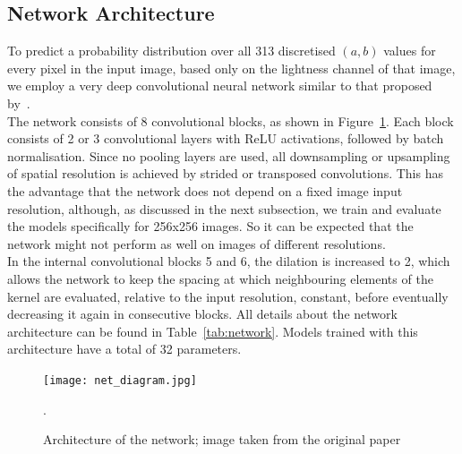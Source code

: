 \documentclass{article}
\begin{document}
\subsection{Network Architecture}
To predict a probability distribution over all 313 discretised $(a, b)$ values for every pixel in the input image,
based only on the lightness channel of that image, we employ a very deep convolutional neural network similar to
that proposed by~\cite{colourful}.\\
The network consists of 8 convolutional blocks, as shown in Figure~\ref{fig:network}.
Each block consists of 2 or 3 convolutional layers with ReLU activations, followed by batch normalisation.
Since no pooling layers are used, all downsampling or upsampling of spatial resolution
is achieved by strided or transposed convolutions.
This has the advantage that the network does not depend on a fixed image input resolution,
although, as discussed in the next subsection, we train and evaluate the models specifically for 256x256 images.
So it can be expected that the network might not perform as well on images of different resolutions.\\
In the internal convolutional blocks 5 and 6, the dilation is increased to 2, which allows the network to
keep the spacing at which neighbouring elements of the kernel are evaluated, relative to the input resolution,
constant, before eventually decreasing it again in consecutive blocks.
All details about the network architecture can be found in Table~\ref{tab:network}.
Models trained with this architecture have a total of 32 parameters.

\begin{figure}
    \centering
    \texttt{[image: net\_diagram.jpg]}
    \caption{Architecture of the network; image taken from the original paper \cite{colourful}}.
    \label{fig:network}
\end{figure}
\end{document}
